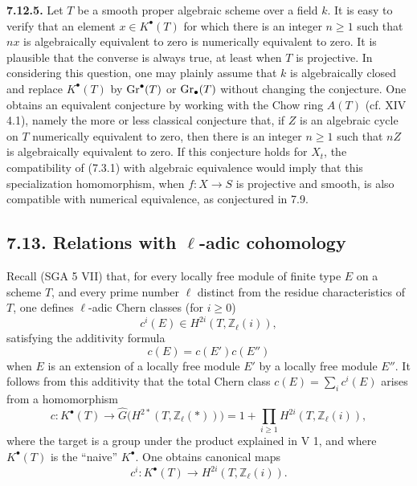 \textbf{7.12.5.}
Let $T$ be a smooth proper algebraic scheme over a field $k$. It is easy to
verify that an element $x\in K^\bullet(T)$ for which there is an integer
$n\geq1$ such that $nx$ is algebraically equivalent to zero is numerically
equivalent to zero. It is plausible that the converse is always true, at
least when $T$ is projective. In considering this question, one may plainly
assume that $k$ is algebraically closed and replace $K^\bullet(T)$ by
$\operatorname{Gr}^\bullet(T)$ or $\operatorname{Gr}_\bullet(T)$ without changing the conjecture. One
obtains an equivalent conjecture by working with the Chow ring $A(T)$
(cf. XIV 4.1), namely the more or less classical conjecture that, if $Z$ is an
algebraic cycle on $T$ numerically equivalent to zero, then there is an
integer $n\geq1$ such that $nZ$ is algebraically equivalent to zero. If this
conjecture holds for $X_t$, the compatibility of (7.3.1) with algebraic
equivalence would imply that this specialization homomorphism, when
$f:X\to S$ is projective and smooth, is also compatible with numerical
equivalence, as conjectured in 7.9.

\subsection*{7.13. Relations with $\ell$-adic cohomology}
Recall (SGA 5 VII) that, for every locally free module of finite type $E$ on
a scheme $T$, and every prime number $\ell$ distinct from the residue
characteristics of $T$, one defines $\ell$-adic Chern classes (for $i\geq0$)
\[
c^i(E)\in H^{2i}(T,\mathbb Z_\ell(i)),
\]
satisfying the additivity formula
\[
c(E)=c(E')c(E'')
\]
when $E$ is an extension of a locally free module $E'$ by a locally free
module $E''$. It follows from this additivity that the total Chern class
$c(E)=\sum_i c^i(E)$ arises from a homomorphism
\begin{equation}\tag{7.13.0}
c:K^\bullet(T)\longrightarrow
\widehat G\bigl(H^{2*}(T,\mathbb Z_\ell(*))\bigr)
=1+\prod_{i\geq1}H^{2i}(T,\mathbb Z_\ell(i)),
\end{equation}
where the target is a group under the product explained in V 1, and where
$K^\bullet(T)$ is the ``naive'' $K^\bullet$. One obtains canonical maps
\begin{equation}\tag{7.13.1}
c^i:K^\bullet(T)\longrightarrow H^{2i}(T,\mathbb Z_\ell(i)).
\end{equation}

